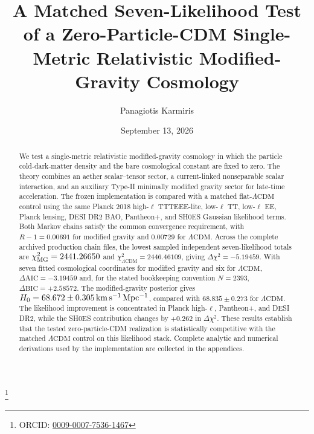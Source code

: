 \documentclass[aps,prd,twocolumn,superscriptaddress,nofootinbib,longbibliography,floatfix]{revtex4-2}
\newcommand{\LCDM}{\Lambda\mathrm{CDM}}
\begin{document}
\title{A Matched Seven-Likelihood Test of a Zero-Particle-CDM Single-Metric Relativistic Modified-Gravity Cosmology}

\author{Panagiotis Karmiris}
\thanks{ORCID: \href{https://orcid.org/0009-0007-7536-1467}{0009-0007-7536-1467}}

\date{September 13, 2026}

\begin{abstract}
We test a single-metric relativistic modified-gravity cosmology in which the particle cold-dark-matter density and the bare cosmological constant are fixed to zero. The theory combines an aether scalar--tensor sector, a current-linked nonseparable scalar interaction, and an auxiliary Type-II minimally modified gravity sector for late-time acceleration. The frozen implementation is compared with a matched flat-$\LCDM$ control using the same Planck 2018 high-$\ell$ TTTEEE-lite, low-$\ell$ TT, low-$\ell$ EE, Planck lensing, DESI DR2 BAO, Pantheon+, and SH0ES Gaussian likelihood terms. Both Markov chains satisfy the common convergence requirement, with $R-1=0.00691$ for modified gravity and $0.00729$ for $\LCDM$. Across the complete archived production chain files, the lowest sampled independent seven-likelihood totals are $\chi^2_{\rm MG}=2441.26650$ and $\chi^2_{\LCDM}=2446.46109$, giving $\Delta\chi^2=-5.19459$. With seven fitted cosmological coordinates for modified gravity and six for $\LCDM$, $\Delta\mathrm{AIC}=-3.19459$ and, for the stated bookkeeping convention $N=2393$, $\Delta\mathrm{BIC}=+2.58572$. The modified-gravity posterior gives $H_0=68.672\pm0.305\,{\rm km\,s^{-1}\,Mpc^{-1}}$, compared with $68.835\pm0.273$ for $\LCDM$. The likelihood improvement is concentrated in Planck high-$\ell$, Pantheon+, and DESI DR2, while the SH0ES contribution changes by $+0.262$ in $\Delta\chi^2$. These results establish that the tested zero-particle-CDM realization is statistically competitive with the matched $\LCDM$ control on this likelihood stack. Complete analytic and numerical derivations used by the implementation are collected in the appendices.
\end{abstract}


\maketitle
\end{document}
